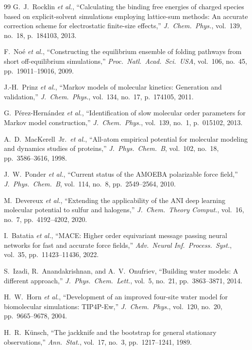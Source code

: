 \documentclass[conference]{IEEEtran}
\begin{document}
\begin{thebibliography}{99}
G.~J.~Rocklin \textit{et al.},
``Calculating the binding free energies of charged species based on
explicit-solvent simulations employing lattice-sum methods: An accurate
correction scheme for electrostatic finite-size effects,''
\textit{J.\ Chem.\ Phys.}, vol.~139, no.~18, p.~184103, 2013.

F.~No{\'e} \textit{et al.},
``Constructing the equilibrium ensemble of folding pathways from short
off-equilibrium simulations,''
\textit{Proc.\ Natl.\ Acad.\ Sci.\ USA}, vol.~106, no.~45,
pp.~19011--19016, 2009.

J.-H.~Prinz \textit{et al.},
``Markov models of molecular kinetics: Generation and validation,''
\textit{J.\ Chem.\ Phys.}, vol.~134, no.~17, p.~174105, 2011.

G.~P{\'e}rez-Hern{\'a}ndez \textit{et al.},
``Identification of slow molecular order parameters for Markov model
construction,''
\textit{J.\ Chem.\ Phys.}, vol.~139, no.~1, p.~015102, 2013.

A.~D.~MacKerell~Jr.\ \textit{et al.},
``All-atom empirical potential for molecular modeling and dynamics
studies of proteins,''
\textit{J.\ Phys.\ Chem.\ B}, vol.~102, no.~18, pp.~3586--3616, 1998.

J.~W.~Ponder \textit{et al.},
``Current status of the AMOEBA polarizable force field,''
\textit{J.\ Phys.\ Chem.\ B}, vol.~114, no.~8, pp.~2549--2564, 2010.

M.~Devereux \textit{et al.},
``Extending the applicability of the ANI deep learning molecular
potential to sulfur and halogens,''
\textit{J.\ Chem.\ Theory Comput.}, vol.~16, no.~7, pp.~4192--4202, 2020.

I.~Batatia \textit{et al.},
``MACE: Higher order equivariant message passing neural networks for
fast and accurate force fields,''
\textit{Adv.\ Neural Inf.\ Process.\ Syst.}, vol.~35, pp.~11423--11436,
2022.

S.~Izadi, R.~Anandakrishnan, and A.~V.~Onufriev,
``Building water models: A different approach,''
\textit{J.\ Phys.\ Chem.\ Lett.}, vol.~5, no.~21, pp.~3863--3871, 2014.

H.~W.~Horn \textit{et al.},
``Development of an improved four-site water model for biomolecular
simulations: TIP4P-Ew,''
\textit{J.\ Chem.\ Phys.}, vol.~120, no.~20, pp.~9665--9678, 2004.

H.~R.~K\"unsch,
``The jackknife and the bootstrap for general stationary observations,''
\textit{Ann.\ Stat.}, vol.~17, no.~3, pp.~1217--1241, 1989.


\end{thebibliography}
\end{document}
